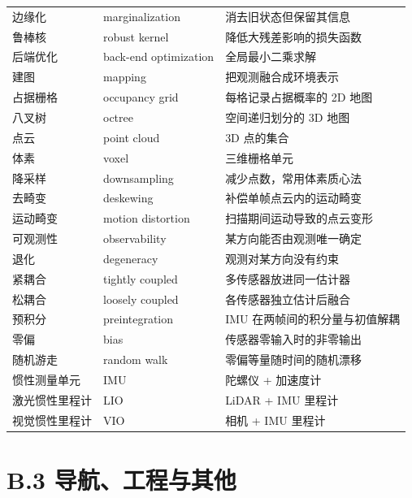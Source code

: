 \begin{table}[htbp]
\begin{tabular}{llp{6.6cm}}
    边缘化 & marginalization & 消去旧状态但保留其信息 \\
    鲁棒核 & robust kernel & 降低大残差影响的损失函数 \\
    后端优化 & back-end optimization & 全局最小二乘求解 \\
    建图 & mapping & 把观测融合成环境表示 \\
    占据栅格 & occupancy grid & 每格记录占据概率的 2D 地图 \\
    八叉树 & octree & 空间递归划分的 3D 地图 \\
    点云 & point cloud & 3D 点的集合 \\
    体素 & voxel & 三维栅格单元 \\
    降采样 & downsampling & 减少点数，常用体素质心法 \\
    去畸变 & deskewing & 补偿单帧点云内的运动畸变 \\
    运动畸变 & motion distortion & 扫描期间运动导致的点云变形 \\
    可观测性 & observability & 某方向能否由观测唯一确定 \\
    退化 & degeneracy & 观测对某方向没有约束 \\
    紧耦合 & tightly coupled & 多传感器放进同一估计器 \\
    松耦合 & loosely coupled & 各传感器独立估计后融合 \\
    预积分 & preintegration & IMU 在两帧间的积分量与初值解耦 \\
    零偏 & bias & 传感器零输入时的非零输出 \\
    随机游走 & random walk & 零偏等量随时间的随机漂移 \\
    惯性测量单元 & IMU & 陀螺仪 + 加速度计 \\
    激光惯性里程计 & LIO & LiDAR + IMU 里程计 \\
    视觉惯性里程计 & VIO & 相机 + IMU 里程计 \\
    \bottomrule
  \end{tabular}
\end{table}

\section*{B.3 导航、工程与其他}

